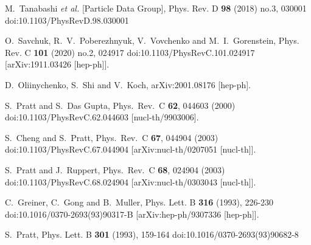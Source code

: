 \documentclass[aps,prc,nofootinbib,showpacs,superscriptaddress,groupedaddress]{revtex4-1}
\begin{document}
\begin{thebibliography}{99}

M.~Tanabashi \textit{et al.} [Particle Data Group],
Phys. Rev. D \textbf{98} (2018) no.3, 030001
doi:10.1103/PhysRevD.98.030001

O.~Savchuk, R.~V.~Poberezhnyuk, V.~Vovchenko and M.~I.~Gorenstein,
Phys. Rev. C \textbf{101} (2020) no.2, 024917
doi:10.1103/PhysRevC.101.024917
[arXiv:1911.03426 [hep-ph]].

  D.~Oliinychenko, S.~Shi and V.~Koch,
  arXiv:2001.08176 [hep-ph].
  
  S.~Pratt and S.~Das Gupta,
  Phys.\ Rev.\ C {\bf 62}, 044603 (2000)
  doi:10.1103/PhysRevC.62.044603
  [nucl-th/9903006].

S.~Cheng and S.~Pratt,
Phys.\ Rev.\ C \textbf{67}, 044904 (2003)
doi:10.1103/PhysRevC.67.044904
[arXiv:nucl-th/0207051 [nucl-th]].

S.~Pratt and J.~Ruppert,
Phys.\ Rev.\ C \textbf{68}, 024904 (2003)
doi:10.1103/PhysRevC.68.024904
[arXiv:nucl-th/0303043 [nucl-th]].

C.~Greiner, C.~Gong and B.~Muller,
Phys. Lett. B \textbf{316} (1993), 226-230
doi:10.1016/0370-2693(93)90317-B
[arXiv:hep-ph/9307336 [hep-ph]].

S.~Pratt,
Phys. Lett. B \textbf{301} (1993), 159-164
doi:10.1016/0370-2693(93)90682-8


\end{thebibliography}
\end{document}
